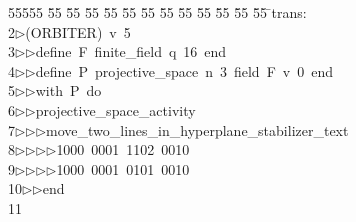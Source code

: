%
%
\begin{tabbing}
55555 \= 55 \= 55 \= 55 \= 55 \= 55 \= 55 \= 55 \= 55 \= 55 \= 55 \= 55 \= 55 \= \>trans:\\[0pt]
2\>$\triangleright$\>(ORBITER)\ v\ 5\ \\[0pt]
3\>$\triangleright$\>$\triangleright$\>define\ F\ finite\_field\ q\ 16\ end\ \\[0pt]
4\>$\triangleright$\>$\triangleright$\>define\ P\ projective\_space\ n\ 3\ field\ F\ v\ 0\ end\ \\[0pt]
5\>$\triangleright$\>$\triangleright$\>with\ P\ do\ \\[0pt]
6\>$\triangleright$\>$\triangleright$\>projective\_space\_activity\ \\[0pt]
7\>$\triangleright$\>$\triangleright$\>$\triangleright$\>move\_two\_lines\_in\_hyperplane\_stabilizer\_text\ \\[0pt]
8\>$\triangleright$\>$\triangleright$\>$\triangleright$\>$\triangleright$\>1000\ 0001\ 1102\ 0010\ \\[0pt]
9\>$\triangleright$\>$\triangleright$\>$\triangleright$\>$\triangleright$\>1000\ 0001\ 0101\ 0010\ \\[0pt]
10\>$\triangleright$\>$\triangleright$\>end\\[0pt]
11\>\end{tabbing}
